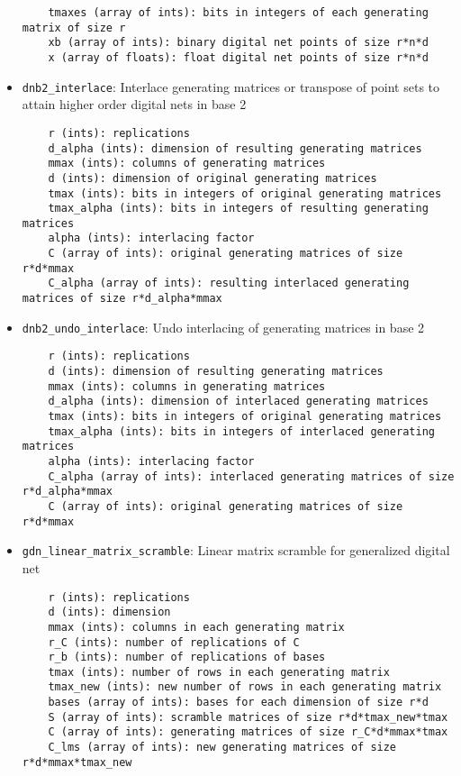 \begin{itemize}
\begin{lstlisting}
    tmaxes (array of ints): bits in integers of each generating matrix of size r
    xb (array of ints): binary digital net points of size r*n*d
    x (array of floats): float digital net points of size r*n*d
\end{lstlisting}
\item
\texttt{dnb2\_interlace}: 
Interlace generating matrices or transpose of point sets to attain higher order digital nets in base 2
\begin{lstlisting}
	r (ints): replications
    d_alpha (ints): dimension of resulting generating matrices 
    mmax (ints): columns of generating matrices
    d (ints): dimension of original generating matrices
    tmax (ints): bits in integers of original generating matrices
    tmax_alpha (ints): bits in integers of resulting generating matrices
    alpha (ints): interlacing factor
    C (array of ints): original generating matrices of size r*d*mmax
    C_alpha (array of ints): resulting interlaced generating matrices of size r*d_alpha*mmax
\end{lstlisting}
\item
\texttt{dnb2\_undo\_interlace}: 
Undo interlacing of generating matrices in base 2
\begin{lstlisting}
	r (ints): replications
    d (ints): dimension of resulting generating matrices 
    mmax (ints): columns in generating matrices
    d_alpha (ints): dimension of interlaced generating matrices
    tmax (ints): bits in integers of original generating matrices 
    tmax_alpha (ints): bits in integers of interlaced generating matrices
    alpha (ints): interlacing factor
    C_alpha (array of ints): interlaced generating matrices of size r*d_alpha*mmax
    C (array of ints): original generating matrices of size r*d*mmax
\end{lstlisting}
\item
\texttt{gdn\_linear\_matrix\_scramble}: 
Linear matrix scramble for generalized digital net
\begin{lstlisting}
	r (ints): replications 
    d (ints): dimension 
    mmax (ints): columns in each generating matrix
    r_C (ints): number of replications of C 
    r_b (ints): number of replications of bases
    tmax (ints): number of rows in each generating matrix 
    tmax_new (ints): new number of rows in each generating matrix 
    bases (array of ints): bases for each dimension of size r*d 
    S (array of ints): scramble matrices of size r*d*tmax_new*tmax
    C (array of ints): generating matrices of size r_C*d*mmax*tmax 
    C_lms (array of ints): new generating matrices of size r*d*mmax*tmax_new

\end{lstlisting}
\end{itemize}
